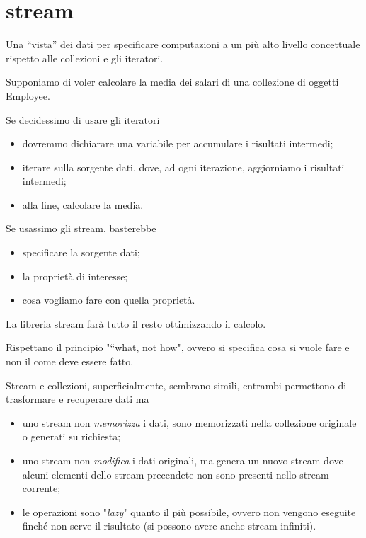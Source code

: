 \chapter{stream}

Una “vista” dei dati per specificare computazioni a un più alto livello concettuale rispetto alle collezioni e gli iteratori.

Supponiamo di voler calcolare la media dei salari di una collezione di oggetti Employee.
\begin{multicols}{2}
    Se decidessimo di usare gli iteratori
    \begin{itemize}
        \item dovremmo dichiarare una variabile per accumulare i risultati intermedi;
        \item iterare sulla sorgente dati, dove, ad ogni iterazione, aggiorniamo i risultati intermedi;
        \item alla fine, calcolare la media.
    \end{itemize}
    \columnbreak
    Se usassimo gli stream, basterebbe
    \begin{itemize}
        \item specificare la sorgente dati;
        \item la proprietà di interesse;
        \item cosa vogliamo fare con quella proprietà.
    \end{itemize}
    La libreria stream farà tutto il resto ottimizzando il calcolo.
\end{multicols}

Rispettano il principio "“what, not how", ovvero si specifica cosa si vuole fare e non il come deve essere fatto. 

Stream e collezioni, superficialmente, sembrano simili, entrambi permettono di trasformare e recuperare dati ma 
\begin{itemize}
    \item uno stream non \textit{memorizza} i dati, sono memorizzati nella collezione originale o generati su richiesta;
    \item uno stream non \textit{modifica} i dati originali, ma genera un nuovo stream dove alcuni elementi dello stream precendete non sono presenti nello stream 
    corrente;
    \item le operazioni sono "\textit{lazy}" quanto il più possibile, ovvero non vengono eseguite finché non serve il risultato (si possono avere anche 
    stream infiniti).
\end{itemize}

